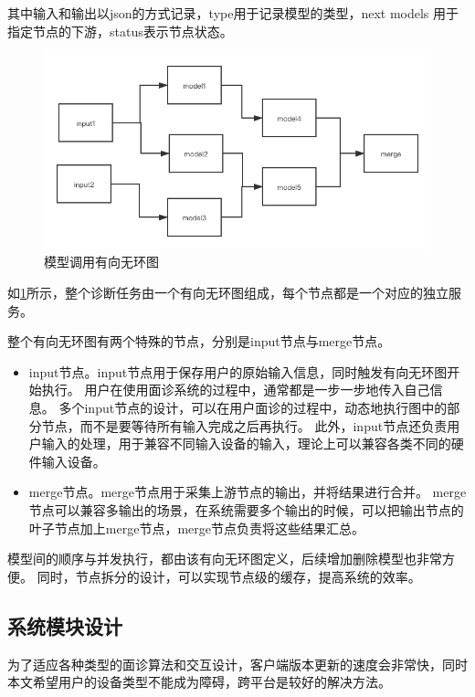 其中输入和输出以json的方式记录，type用于记录模型的类型，next models 用于指定节点的下游，status表示节点状态。

\begin{figure}
    \centering
    \includegraphics[width=15cm]{images/model_dag.png}
    \caption{模型调用有向无环图}
    \label{fig:model_dag}
\end{figure}

如\ref{fig:model_dag}所示，整个诊断任务由一个有向无环图组成，每个节点都是一个对应的独立服务。

整个有向无环图有两个特殊的节点，分别是input节点与merge节点。

\begin{itemize}
    \item input节点。input节点用于保存用户的原始输入信息，同时触发有向无环图开始执行。
    用户在使用面诊系统的过程中，通常都是一步一步地传入自己信息。
    多个input节点的设计，可以在用户面诊的过程中，动态地执行图中的部分节点，而不是要等待所有输入完成之后再执行。
    此外，input节点还负责用户输入的处理，用于兼容不同输入设备的输入，理论上可以兼容各类不同的硬件输入设备。

    \item merge节点。merge节点用于采集上游节点的输出，并将结果进行合并。
    merge节点可以兼容多输出的场景，在系统需要多个输出的时候，可以把输出节点的叶子节点加上merge节点，merge节点负责将这些结果汇总。
\end{itemize}



模型间的顺序与并发执行，都由该有向无环图定义，后续增加删除模型也非常方便。
同时，节点拆分的设计，可以实现节点级的缓存，提高系统的效率。


\subsection{系统模块设计}
为了适应各种类型的面诊算法和交互设计，客户端版本更新的速度会非常快，同时本文希望用户的设备类型不能成为障碍，跨平台是较好的解决方法。


